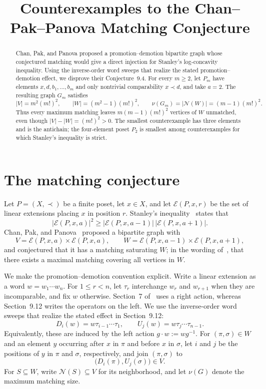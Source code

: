 \documentclass[11pt]{amsart}
\title[Counterexamples to the Chan--Pak--Panova conjecture]
{Counterexamples to the Chan--Pak--Panova Matching Conjecture}
\date{}
\newcommand{\cE}{\mathcal E}
\newcommand{\cN}{\mathcal N}
\begin{document}
\begin{abstract}
Chan, Pak, and Panova proposed a promotion--demotion bipartite graph whose
conjectured matching would give a direct injection for Stanley's log-concavity
inequality. Using the inverse-order word sweeps that realize the stated
promotion--demotion effect, we disprove their Conjecture~9.4. For every
$m\ge2$, let $P_m$ have elements $x,d,b_1,\ldots,b_m$ and only nontrivial
comparability $x\prec d$, and take $a=2$. The resulting graph $G_m$ satisfies
\[
 |V|=m^2(m!)^2,\qquad
 |W|=(m^2-1)(m!)^2,\qquad
 \nu(G_m)=|\cN(W)|=(m-1)(m!)^2.
\]
Thus every maximum matching leaves $m(m-1)(m!)^2$ vertices of $W$ unmatched,
even though $|V|-|W|=(m!)^2>0$. The smallest counterexample has three
elements and is the antichain; the four-element poset $P_2$ is smallest among
counterexamples for which Stanley's inequality is strict.
\end{abstract}

\maketitle

\section{The matching conjecture}

Let $P=(X,\prec)$ be a finite poset, let $x\in X$, and let
$\cE(P,x,r)$ be the set of linear extensions placing $x$ in position $r$.
Stanley's inequality~\cite{Sta81} states that
\begin{equation}\label{eq:stanley}
 |\cE(P,x,a)|^2
 \ge
 |\cE(P,x,a-1)|\,|\cE(P,x,a+1)|.
\end{equation}
Chan, Pak, and Panova~\cite[Conjecture~9.4]{CPP23} proposed a bipartite graph
with
\[
 V=\cE(P,x,a)\times\cE(P,x,a),
 \qquad
 W=\cE(P,x,a-1)\times\cE(P,x,a+1),
\]
and conjectured that it has a matching saturating $W$; in the wording
of~\cite{CPP23}, that there exists a maximal matching covering all vertices
in $W$.

We make the promotion--demotion convention explicit. Write a linear extension
as a word $w=w_1\cdots w_n$. For $1\le r<n$, let $\tau_r$ interchange
$w_r$ and $w_{r+1}$ when they are incomparable, and fix $w$ otherwise.
Section~7 of~\cite{CPP23} uses a right action, whereas Section~9.12 writes the
operators on the left. We use the inverse-order word sweeps that realize the
stated effect in Section~9.12:
\begin{equation}\label{eq:sweeps}
 D_i(w)=w\tau_{i-1}\cdots\tau_1,
 \qquad
 U_j(w)=w\tau_j\cdots\tau_{n-1}.
\end{equation}
Equivalently, these are induced by the left action $g\cdot w:=wg^{-1}$.
For $(\pi,\sigma)\in W$ and an element $y$ occurring after $x$ in $\pi$ and
before $x$ in $\sigma$, let $i$ and $j$ be the positions of $y$ in $\pi$ and
$\sigma$, respectively, and join $(\pi,\sigma)$ to
\[
 \bigl(D_i(\pi),U_j(\sigma)\bigr)\in V.
\]
For $S\subseteq W$, write $\cN(S)\subseteq V$ for its neighborhood, and let
$\nu(G)$ denote the maximum matching size.
\end{document}
